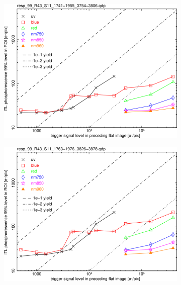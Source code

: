 \begin{figure}[!htbp]
\centering
\begin{subfigure}{0.45\textwidth}    
  \centering
  \includegraphics[width=\textwidth]{figures/phosphorescence-survey/phos_resp/resp_99_R43_S11_1741-1955_3754-3806.png}    
\end{subfigure}
\newline
\centering
\begin{subfigure}{0.45\textwidth}    
  \centering
  \includegraphics[width=\textwidth]{figures/phosphorescence-survey/phos_resp/resp_99_R43_S11_1763-1976_3826-3878.png}    
\end{subfigure}
\newline

\end{figure}

